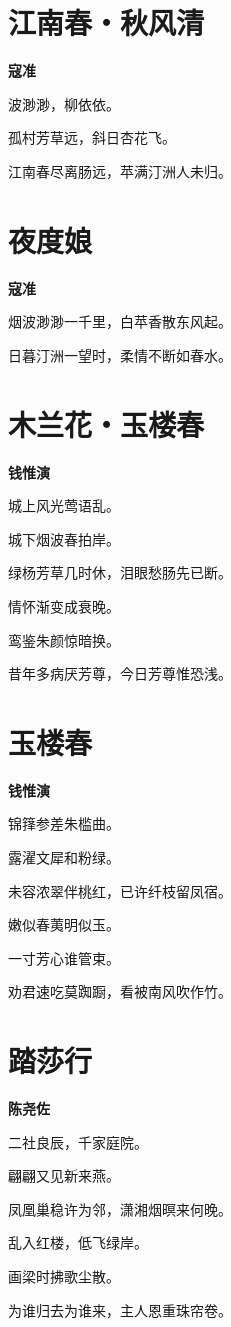 \documentclass[12pt,a4paper]{ctexbook}
\begin{document}
\section{江南春・秋风清}
\textbf{寇准}\par\vspace{0.5em}
波渺渺，柳依依。\par
孤村芳草远，斜日杏花飞。\par
江南春尽离肠远，苹满汀洲人未归。\par

\section{夜度娘}
\textbf{寇准}\par\vspace{0.5em}
烟波渺渺一千里，白苹香散东风起。\par
日暮汀洲一望时，柔情不断如春水。\par

\section{木兰花・玉楼春}
\textbf{钱惟演}\par\vspace{0.5em}
城上风光莺语乱。\par
城下烟波春拍岸。\par
绿杨芳草几时休，泪眼愁肠先已断。\par
情怀渐变成衰晚。\par
鸾鉴朱颜惊暗换。\par
昔年多病厌芳尊，今日芳尊惟恐浅。\par

\section{玉楼春}
\textbf{钱惟演}\par\vspace{0.5em}
锦箨参差朱槛曲。\par
露濯文犀和粉绿。\par
未容浓翠伴桃红，已许纤枝留凤宿。\par
嫩似春荑明似玉。\par
一寸芳心谁管束。\par
劝君速吃莫踟蹰，看被南风吹作竹。\par

\section{踏莎行}
\textbf{陈尧佐}\par\vspace{0.5em}
二社良辰，千家庭院。\par
翩翩又见新来燕。\par
凤凰巢稳许为邻，潇湘烟暝来何晚。\par
乱入红楼，低飞绿岸。\par
画梁时拂歌尘散。\par
为谁归去为谁来，主人恩重珠帘卷。\par
\end{document}
